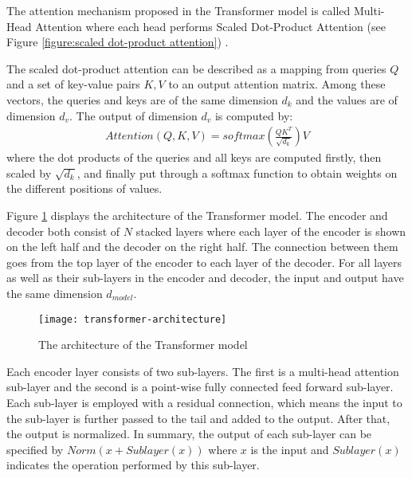 The attention mechanism proposed in the Transformer model is called Multi-Head Attention where each head performs Scaled Dot-Product Attention (see Figure \ref{figure:scaled dot-product attention}) \cite{Vaswani2017}. 

The scaled dot-product attention can be described as a mapping from queries $ Q $ and a set of key-value pairs $ K, V $ to an output attention matrix. Among these vectors, the queries and keys are of the same dimension $ d_{k} $ and the values are of dimension $ d_{v} $. The output of dimension $ d_{v} $ is computed by:
\begin{align} \label{eq:scaled-dot attention}
Attention(Q,K,V) = softmax(\frac{QK^{T}}{\sqrt{d_{k}}})V
\end{align}
where the dot products of the queries and all keys are computed firstly, then scaled by $ \sqrt{d_{k}} $, and finally put through a softmax function to obtain weights on the different positions of values.

Figure \ref{figure:transformer model} displays the architecture of the Transformer model. The encoder and decoder both consist of $ N $ stacked layers where each layer of the encoder is shown on the left half and the decoder on the right half. The connection between them goes from the top layer of the encoder to each layer of the decoder. For all layers as well as their sub-layers in the encoder and decoder, the input and output have the same dimension $ d_{model} $.

\begin{figure}[h]
\texttt{[image: transformer-architecture]}
\centering
\caption{The architecture of the Transformer model \cite{Vaswani2017}}
\label{figure:transformer model}
\end{figure}

Each encoder layer consists of two sub-layers. The first is a multi-head attention sub-layer and the second is a point-wise fully connected feed forward sub-layer. Each sub-layer is employed with a residual connection, which means the input to the sub-layer is further passed to the tail and added to the output. After that, the output is normalized. In summary, the output of each sub-layer can be specified by $ Norm(x+Sublayer(x)) $ where $ x $ is the input and $ Sublayer(x) $ indicates the operation performed by this sub-layer. 


